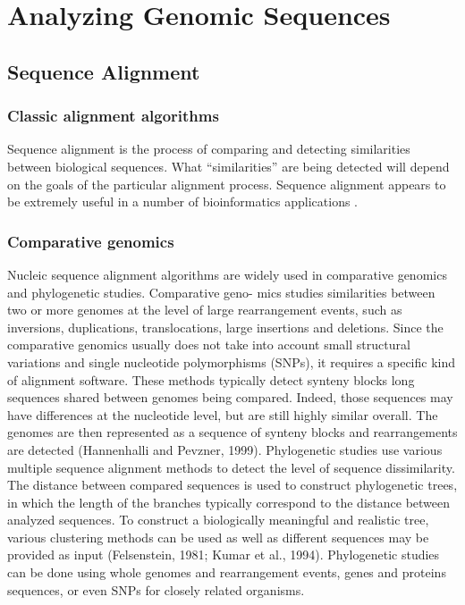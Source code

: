 \chapter{Analyzing Genomic Sequences}\label{ch:ch6}

\section{Sequence Alignment} 
\subsection{Classic alignment algorithms}
Sequence alignment is the process of comparing and detecting similarities between biological sequences. What “similarities” are being detected will depend on the goals of the particular alignment process. Sequence alignment appears to be extremely useful in a number of bioinformatics applications \cite{seq2018}.

\subsection{Comparative genomics}
Nucleic sequence alignment algorithms are widely used in comparative genomics and phylogenetic studies. Comparative geno-
mics studies similarities between two or more genomes at the level of large rearrangement events, such as inversions, duplications,
translocations, large insertions and deletions. Since the comparative genomics usually does not take into account small structural
variations and single nucleotide polymorphisms (SNPs), it requires a specific kind of alignment software. These methods typically
detect synteny blocks long sequences shared between genomes being compared. Indeed, those sequences may have differences at
the nucleotide level, but are still highly similar overall. The genomes are then represented as a sequence of synteny blocks and
rearrangements are detected (Hannenhalli and Pevzner, 1999).
Phylogenetic studies use various multiple sequence alignment methods to detect the level of sequence dissimilarity. The distance
between compared sequences is used to construct phylogenetic trees, in which the length of the branches typically correspond to the
distance between analyzed sequences. To construct a biologically meaningful and realistic tree, various clustering methods can be used
as well as different sequences may be provided as input (Felsenstein, 1981; Kumar et al., 1994). Phylogenetic studies can be done using
whole genomes and rearrangement events, genes and proteins sequences, or even SNPs for closely related organisms\cite{seq2018}.



